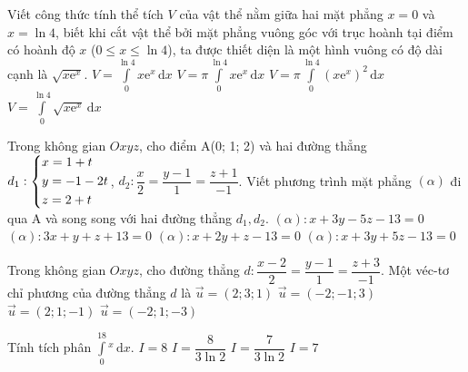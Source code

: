 \begin{ex}%
Viết công thức tính thể tích $V$ của vật thể nằm giữa hai mặt phẳng $x=0$ và $x=\ln 4$, biết khi cắt vật thể bởi mặt phẳng vuông góc với trục hoành tại điểm có hoành độ $x$ ($0\le x\le \ln 4$), ta được thiết diện là một hình vuông có độ dài cạnh là $\sqrt{x\mathrm{e}^x}$.
\choice
{\True $V=\displaystyle\int\limits_0^{\ln 4}x\mathrm{e}^x\mathrm{\,d}x$}
{$V=\pi\displaystyle\int\limits_0^{\ln 4}x\mathrm{e}^x\mathrm{\,d}x$}
{$V=\pi\displaystyle\int\limits_0^{\ln 4}\left(x\mathrm{e}^x\right)^2\mathrm{\,d}x$}
{$V=\displaystyle\int\limits_0^{\ln 4}\sqrt{x\mathrm{e}^x}\mathrm{\,d}x$}
\end{ex}
\begin{ex}%
	Trong không gian $Oxyz$, cho điểm A(0; 1; 2) và hai đường thẳng $d_1 : \left\{\begin{aligned}&x=1+t\\&y=-1-2t\\&z=2+t\end{aligned}\right.$, $d_2: \dfrac{x}{2}=\dfrac{y-1}{1}=\dfrac{z+1}{-1}$. Viết phương trình mặt phẳng $(\alpha)$ đi qua A và song song với hai đường thẳng $d_1, d_2$.
	\choice
	{ $(\alpha): x+3y-5z-13=0$}
	{ $(\alpha): 3x+y+z+13=0$}
	{ $(\alpha): x+2y+z-13=0$}
	{\True $(\alpha): x+3y+5z-13=0$}
\end{ex}
\begin{ex}%
	Trong không gian $Oxyz$, cho đường thẳng $d: \dfrac{x-2}{2}=\dfrac{y-1}{1}=\dfrac{z+3}{-1}$. Một véc-tơ chỉ phương của đường thẳng $d$ là
	\choice
	{ $\vec{u}=\left(2;3;1\right)$}
	{ $\vec{u}=\left(-2;-1;3\right)$}
	{\True $\vec{u}=\left(2;1;-1\right)$}
	{ $\vec{u}=\left(-2;1;-3\right)$}
\end{ex}
\begin{ex}%
	Tính tích phân $\displaystyle \int \limits_{0}^18^x \mathrm{\, d}x$.
	\choice
	{ $I=8$}
	{ $I=\dfrac{8}{3\ln2}$}
	{\True $I=\dfrac{7}{3\ln2}$}
	{ $I=7$}
\end{ex}
